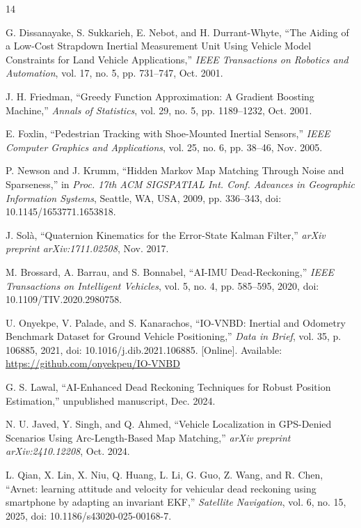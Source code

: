 \documentclass[conference]{IEEEtran}
\begin{document}
\begin{thebibliography}{14}
\setlength{\itemsep}{1pt plus 1pt}
\setlength{\parskip}{0pt}
\footnotesize

 G. Dissanayake, S. Sukkarieh, E. Nebot, and H. Durrant-Whyte, ``The Aiding of a Low-Cost Strapdown Inertial Measurement Unit Using Vehicle Model Constraints for Land Vehicle Applications,'' \emph{IEEE Transactions on Robotics and Automation}, vol. 17, no. 5, pp. 731--747, Oct. 2001.

 J. H. Friedman, ``Greedy Function Approximation: A Gradient Boosting Machine,'' \emph{Annals of Statistics}, vol. 29, no. 5, pp. 1189--1232, Oct. 2001.

 E. Foxlin, ``Pedestrian Tracking with Shoe-Mounted Inertial Sensors,'' \emph{IEEE Computer Graphics and Applications}, vol. 25, no. 6, pp. 38--46, Nov. 2005.

 P. Newson and J. Krumm, ``Hidden Markov Map Matching Through Noise and Sparseness,'' in \emph{Proc. 17th ACM SIGSPATIAL Int. Conf. Advances in Geographic Information Systems}, Seattle, WA, USA, 2009, pp. 336--343, doi: 10.1145/1653771.1653818.

 J. Solà, ``Quaternion Kinematics for the Error-State Kalman Filter,'' \emph{arXiv preprint arXiv:1711.02508}, Nov. 2017.

 M. Brossard, A. Barrau, and S. Bonnabel, ``AI-IMU Dead-Reckoning,'' \emph{IEEE Transactions on Intelligent Vehicles}, vol. 5, no. 4, pp. 585--595, 2020, doi: 10.1109/TIV.2020.2980758.

 U. Onyekpe, V. Palade, and S. Kanarachos, ``IO-VNBD: Inertial and Odometry Benchmark Dataset for Ground Vehicle Positioning,'' \emph{Data in Brief}, vol. 35, p. 106885, 2021, doi: 10.1016/j.dib.2021.106885. [Online]. Available: \url{https://github.com/onyekpeu/IO-VNBD}

 G. S. Lawal, ``AI-Enhanced Dead Reckoning Techniques for Robust Position Estimation,'' unpublished manuscript, Dec. 2024.

 N. U. Javed, Y. Singh, and Q. Ahmed, ``Vehicle Localization in GPS-Denied Scenarios Using Arc-Length-Based Map Matching,'' \emph{arXiv preprint arXiv:2410.12208}, Oct. 2024.

 L. Qian, X. Lin, X. Niu, Q. Huang, L. Li, G. Guo, Z. Wang, and R. Chen, ``Avnet: learning attitude and velocity for vehicular dead reckoning using smartphone by adapting an invariant EKF,'' \emph{Satellite Navigation}, vol. 6, no. 15, 2025, doi: 10.1186/s43020-025-00168-7.


\end{thebibliography}
\end{document}
